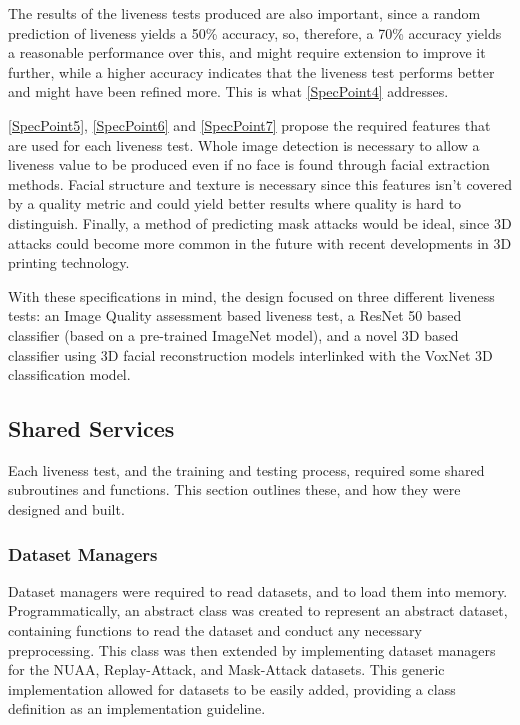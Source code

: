 \documentclass[12pt,a4paper]{article}
\begin{document}
        The results of the liveness tests produced are also important, since a random prediction of liveness yields a 50\% accuracy, so, therefore, a 70\% accuracy yields a reasonable performance over this, and might require extension to improve it further,
        while a higher accuracy indicates that the liveness test performs better and might have been refined more. This is what \ref{SpecPoint4} addresses.

        \ref{SpecPoint5}, \ref{SpecPoint6} and \ref{SpecPoint7} propose the required features that are used for each liveness test. Whole image detection is necessary to allow a liveness value to be produced even if no face is found through facial extraction methods. Facial structure and texture is necessary since this features isn't covered by a quality metric and could yield better results where quality is hard to distinguish. Finally, a method of predicting mask attacks would be ideal, since 3D attacks could become more common in the future with recent developments in 3D printing technology.

        With these specifications in mind, the design focused on three different liveness tests: an Image Quality assessment based liveness test, a ResNet 50 based classifier (based on a pre-trained ImageNet model),
        and a novel 3D based classifier using 3D facial reconstruction models interlinked with the VoxNet 3D classification model.


    \subsection{Shared Services}
        Each liveness test, and the training and testing process, required some shared subroutines and functions. This section outlines these, and how they were designed and built.
        \subsubsection{Dataset Managers}
        Dataset managers were required to read datasets, and to load them into memory. Programmatically, an abstract class was created to represent an abstract dataset, containing functions to read the dataset and conduct any necessary preprocessing. This class was then extended by implementing dataset managers for the NUAA, Replay-Attack, and Mask-Attack datasets. This generic implementation allowed for datasets to be easily added, providing a class definition as an implementation guideline. 
\end{document}
